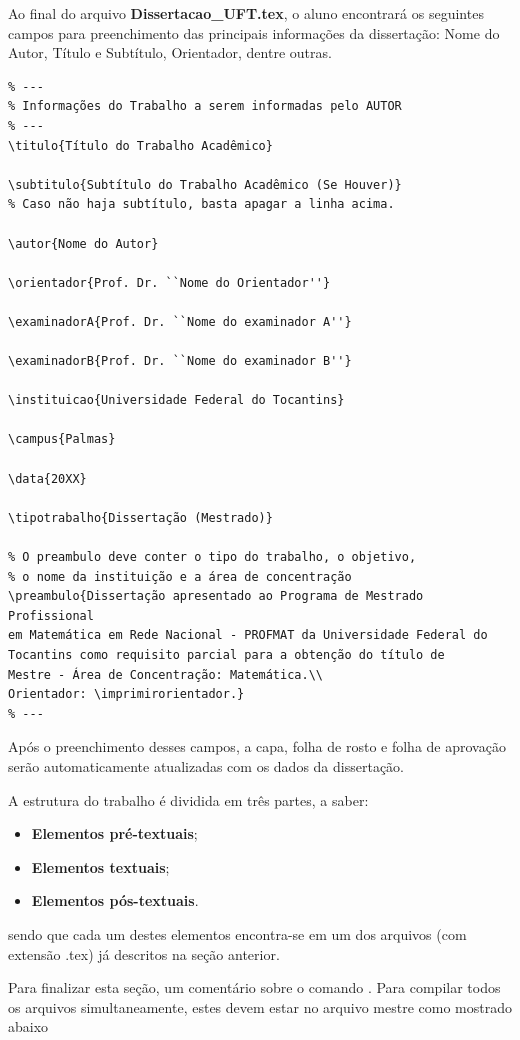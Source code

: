 Ao final do arquivo \textbf{Dissertacao\_UFT.tex}, o aluno encontrará os seguintes campos para preenchimento das principais informações da dissertação: Nome do Autor, Título e Subtítulo, Orientador, dentre outras.
\begin{verbatim}
% ---
% Informações do Trabalho a serem informadas pelo AUTOR
% ---
\titulo{Título do Trabalho Acadêmico}

\subtitulo{Subtítulo do Trabalho Acadêmico (Se Houver)}   
% Caso não haja subtítulo, basta apagar a linha acima.

\autor{Nome do Autor}

\orientador{Prof. Dr. ``Nome do Orientador''}

\examinadorA{Prof. Dr. ``Nome do examinador A''}

\examinadorB{Prof. Dr. ``Nome do examinador B''}

\instituicao{Universidade Federal do Tocantins}

\campus{Palmas}

\data{20XX}

\tipotrabalho{Dissertação (Mestrado)}

% O preambulo deve conter o tipo do trabalho, o objetivo, 
% o nome da instituição e a área de concentração 
\preambulo{Dissertação apresentado ao Programa de Mestrado Profissional 
em Matemática em Rede Nacional - PROFMAT da Universidade Federal do 
Tocantins como requisito parcial para a obtenção do título de 
Mestre - Área de Concentração: Matemática.\\
Orientador: \imprimirorientador.}
% ---
\end{verbatim}

Após o preenchimento desses campos, a capa, folha de rosto e folha de aprovação serão automaticamente atualizadas com os dados da dissertação.


A estrutura do trabalho é dividida em três partes, a saber:
\begin{itemize}
	\item \textbf{Elementos pré-textuais};
	\item \textbf{Elementos textuais};
	\item \textbf{Elementos pós-textuais}.
\end{itemize}
sendo que cada um destes elementos encontra-se em um dos arquivos (com extensão .tex) já descritos na seção anterior.


Para finalizar esta seção, um comentário sobre o comando \verb!!. Para compilar todos os arquivos simultaneamente, estes devem estar no arquivo mestre como mostrado abaixo


